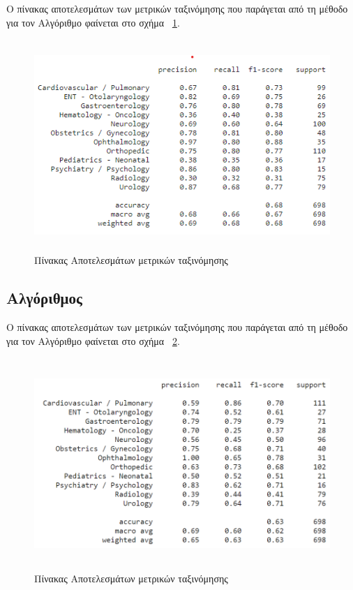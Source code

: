 Ο πίνακας αποτελεσμάτων των μετρικών ταξινόμησης που παράγεται από τη μέθοδο  για τον Αλγόριθμο  φαίνεται στο σχήμα ~\ref{figure5.13}.

\begin{figure} [ht!]
\centering
\includegraphics[width=\textwidth,height=8cm,keepaspectratio]{pictures/SVM_NO_SMOTE.png} 
\caption{Πίνακας Αποτελεσμάτων μετρικών ταξινόμησης}\label{figure5.13}
\end{figure}
\clearpage

\subsection{Αλγόριθμος }
Ο πίνακας αποτελεσμάτων των μετρικών ταξινόμησης που παράγεται από τη μέθοδο  για τον Αλγόριθμο  φαίνεται στο σχήμα ~\ref{figure5.14}.

\begin{figure} [ht!]
\centering
\includegraphics[width=\textwidth,height=8cm,keepaspectratio]{pictures/knn_NO_SMOTE.png} 
\caption{Πίνακας Αποτελεσμάτων μετρικών ταξινόμησης}\label{figure5.14}
\end{figure}




